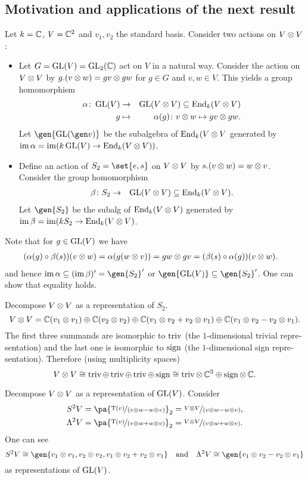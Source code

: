 \documentclass[12pt,a4paper]{scrartcl}
\theoremstyle{cplain}
\theoremstyle{cplain}
\theoremstyle{cplain}
\theoremstyle{definition}
\begin{document}
\begin{otherlanguage}{english}
\subsection*{Motivation and applications of the next result}
Let $k=\mathbb C$, $V = \mathbb C^2$ and $v_1,v_2$ the standard basis. Consider two actions on $V \otimes V$:
\begin{itemize}
  \item Let $G = \operatorname{GL}(V) = \operatorname{GL}_2(\mathbb C)$ act on $V$ in a natural way. Consider the action on $V\otimes V$ by $g.(v\otimes w) = gv \otimes gw$ for $g\in G$ and $v,w\in V$. This yields a group homomorphism
  \begin{eqnarray*}
    \alpha\colon \operatorname{GL}(V) &\to& \operatorname{GL}(V\otimes V) \subseteq \operatorname{End}_k(V\otimes V) \\
    g &\mapsto& \alpha(g) \colon v\otimes w \mapsto gv \otimes gw.
  \end{eqnarray*}
  Let $\gen{\GL(\gen v)}$ be the subalgebra of $\operatorname{End}_k(V\otimes V$ generated by $\operatorname{im}\alpha = \operatorname{im}(k\operatorname{GL}(V) \to \operatorname{End}_k(V\otimes V))$.
  \item Define an action of $S_2 = \set{e,s}$ on $V\otimes V$ by $s.(v\otimes w) = w\otimes v$. Consider the group homomorphism \begin{eqnarray*}\beta\colon S_2 &\to& \operatorname{GL}(V\otimes V) \subseteq \operatorname{End}_k(V\otimes V).\end{eqnarray*} Let $\gen{S_2}$ be the subalg of $\operatorname{End}_k(V\otimes V)$ generated by $\operatorname{im}\beta = \operatorname{im}(kS_2 \to \operatorname{End}_k(V\otimes V)$.
\end{itemize}
Note that for $g\in \operatorname{GL}(V)$ we have
\begin{align*}
  (\alpha(g)\circ \beta(s))(v\otimes w) &= \alpha(g(w\otimes v)) = gw \otimes gv = (\beta(s)\circ \alpha(g))(v\otimes w).
\end{align*}
and hence $\im\alpha \subseteq (\im\beta)' = \gen{S_2}'$ or $\gen{\GL(V)} \subseteq \gen{S_2}'$. One can show that equality holds.

Decompose $V\otimes V$ as a representation of $S_2$.
\[V\otimes V = \mathbb C(v_1\otimes v_1) \oplus \mathbb C(v_2\otimes v_2) \oplus \mathbb C(v_1\otimes v_2 + v_2 \otimes v_1) \oplus \mathbb C(v_1\otimes v_2 - v_2 \otimes v_1). \]
The first three summands are isomorphic to $\operatorname{triv}$ (the $1$-dimensional trivial representation) and the last one is isomorphic to $\operatorname{sign}$ (the $1$-dimensional sign representation). Therefore (using multiplicity spaces) \[ V\otimes V \cong \operatorname{triv} \oplus \operatorname{triv} \oplus \operatorname{triv} \oplus \operatorname{sign} \cong \operatorname{triv} \otimes \,\mathbb C^3 \oplus \operatorname{sign} \otimes\, \mathbb C.\]

Decompose $V\otimes V$ as a representation of $\operatorname{GL}(V)$. Consider
\begin{align*}
  S^2V &= \pa{\fak{\T(v)}{(v\tp w - w \tp v)}}_2 = \fak{V\tp V}{(v\tp w - w\tp v)}, \\
  \Lambda^2V &= \pa{\fak{\T(v)}{(v\tp w + w \tp v)}}_2 = \fak{V\tp V}{(v\tp w + w\tp v)}.
\end{align*}
One can see \[ S^2V \cong \gen{v_1\tp v_1,v_2\tp v_2,v_1\tp v_2+ v_2\tp v_1} \quad\text{and}\quad \Lambda^2V \cong \gen{v_1\tp v_2 - v_2 \tp v_1} \] as representations of $\operatorname{GL}(V)$.


\end{otherlanguage}
\end{document}
